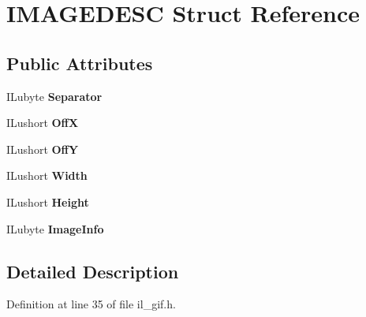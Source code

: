 \hypertarget{structIMAGEDESC}{}\section{I\+M\+A\+G\+E\+D\+E\+SC Struct Reference}
\label{structIMAGEDESC}
\subsection*{Public Attributes}
\begin{DoxyCompactItemize}
\item 
\mbox{\label{structIMAGEDESC_ab634efbef6f0b82d403cb17368959362}} 
I\+Lubyte {\bfseries Separator}
\item 
\mbox{\label{structIMAGEDESC_a02d3b4b1eb7e9a46d66af9af30a878a9}} 
I\+Lushort {\bfseries OffX}
\item 
\mbox{\label{structIMAGEDESC_ac843c59bab872882dd6dbd38c4c3ccf5}} 
I\+Lushort {\bfseries OffY}
\item 
\mbox{\label{structIMAGEDESC_a9b7a022a37e7e33ce3517f0a13b3c97e}} 
I\+Lushort {\bfseries Width}
\item 
\mbox{\label{structIMAGEDESC_aa8e7ab942f4910512d16ef96ada73b60}} 
I\+Lushort {\bfseries Height}
\item 
\mbox{\label{structIMAGEDESC_a0fe57020a09d4b0d584b21cc27b7a617}} 
I\+Lubyte {\bfseries Image\+Info}
\end{DoxyCompactItemize}


\subsection{Detailed Description}


Definition at line 35 of file il\+\_\+gif.\+h.



